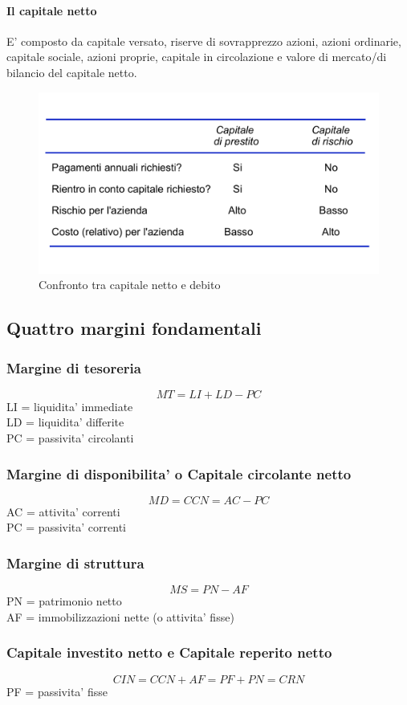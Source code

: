 \documentclass{report}
\begin{document}
	\paragraph{Il capitale netto} E' composto da capitale versato, riserve di sovrapprezzo azioni, azioni ordinarie, capitale sociale, azioni proprie, capitale in circolazione e valore di mercato/di bilancio del capitale netto.
	\begin{figure}[h]
		\centering
		\includegraphics[width=0.7\linewidth]{confronto-capitali}
		\caption{Confronto tra capitale netto e debito}
		\label{fig:confronto-capitali}
	\end{figure}
	\subsection{Quattro margini fondamentali}
	\subsubsection{Margine di tesoreria}
	\[MT = LI + LD - PC\]
	LI = liquidita' immediate\\LD = liquidita' differite\\PC = passivita' circolanti
	\subsubsection{Margine di disponibilita' o Capitale circolante netto}
	\[MD = CCN = AC - PC\]
	AC = attivita' correnti\\PC = passivita' correnti
	\subsubsection{Margine di struttura}
	\[MS = PN - AF\]
	PN = patrimonio netto\\AF = immobilizzazioni nette (o attivita' fisse)
	\subsubsection{Capitale investito netto e Capitale reperito netto}
	\[CIN = CCN + AF = PF + PN = CRN\]
	PF = passivita' fisse
\end{document}
